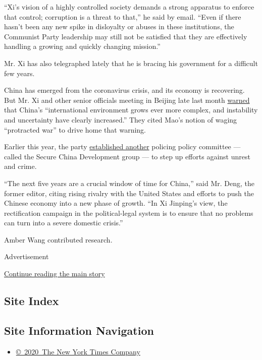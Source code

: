 ``Xi's vision of a highly controlled society demands a strong apparatus
to enforce that control; corruption is a threat to that,'' he said by
email. ``Even if there hasn't been any new spike in disloyalty or abuses
in these institutions, the Communist Party leadership may still not be
satisfied that they are effectively handling a growing and quickly
changing mission.''

Mr. Xi has also telegraphed lately that he is bracing his government for
a difficult few years.

China has emerged from the coronavirus crisis, and its economy is
recovering. But Mr. Xi and other senior officials meeting in Beijing
late last month
\href{http://cpc.people.com.cn/n1/2020/0731/c64094-31804564.html}{warned}
that China's ``international environment grows ever more complex, and
instability and uncertainty have clearly increased.'' They cited Mao's
notion of waging ``protracted war'' to drive home that warning.

Earlier this year, the party
\href{http://www.xinhuanet.com/politics/leaders/2020-04/21/c_1125887251.htm}{established
another} policing policy committee --- called the Secure China
Development group --- to step up efforts against unrest and crime.

``The next five years are a crucial window of time for China,'' said Mr.
Deng, the former editor, citing rising rivalry with the United States
and efforts to push the Chinese economy into a new phase of growth. ``In
Xi Jinping's view, the rectification campaign in the political-legal
system is to ensure that no problems can turn into a severe domestic
crisis.''

Amber Wang contributed research.

Advertisement

\protect\hyperlink{after-bottom}{Continue reading the main story}

\hypertarget{site-index}{%
\subsection{Site Index}\label{site-index}}

\hypertarget{site-information-navigation}{%
\subsection{Site Information
Navigation}\label{site-information-navigation}}

\begin{itemize}
\tightlist
\item
  \href{https://help.nytimes3xbfgragh.onion/hc/en-us/articles/115014792127-Copyright-notice}{©~2020~The
  New York Times Company}
\end{itemize}

